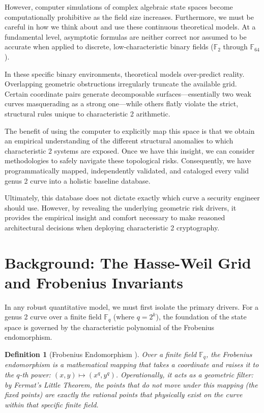\documentclass[11pt,letterpaper]{article}
\newtheorem{definition}[theorem]{Definition}
\begin{document}
However, computer simulations of complex algebraic state spaces become computationally prohibitive as the field size increases. Furthermore, we must be careful in how we think about and use these continuous theoretical models. At a fundamental level, asymptotic formulas are neither correct nor assumed to be accurate when applied to discrete, low-characteristic binary fields ($\mathbb{F}_2$ through $\mathbb{F}_{64}$). 

In these specific binary environments, theoretical models over-predict reality. Overlapping geometric obstructions irregularly truncate the available grid. Certain coordinate pairs generate decomposable surfaces---essentially two weak curves masquerading as a strong one---while others flatly violate the strict, structural rules unique to characteristic 2 arithmetic. 

The benefit of using the computer to explicitly map this space is that we obtain an empirical understanding of the different structural anomalies to which characteristic 2 systems are exposed. Once we have this insight, we can consider methodologies to safely navigate these topological risks. Consequently, we have programmatically mapped, independently validated, and cataloged every valid genus 2 curve into a holistic baseline database. 

Ultimately, this database does not dictate exactly which curve a security engineer should use. However, by revealing the underlying geometric risk drivers, it provides the empirical insight and comfort necessary to make reasoned architectural decisions when deploying characteristic 2 cryptography.

\section{Background: The Hasse-Weil Grid and Frobenius Invariants}
In any robust quantitative model, we must first isolate the primary drivers. For a genus 2 curve over a finite field $\mathbb{F}_q$ (where $q = 2^k$), the foundation of the state space is governed by the characteristic polynomial of the Frobenius endomorphism. 

\begin{definition}[Frobenius Endomorphism \cite{Silverman2009}]
Over a finite field $\mathbb{F}_q$, the Frobenius endomorphism is a mathematical mapping that takes a coordinate and raises it to the $q$-th power: $(x, y) \mapsto (x^q, y^q)$. Operationally, it acts as a geometric filter: by Fermat's Little Theorem, the points that do not move under this mapping (the fixed points) are exactly the rational points that physically exist on the curve within that specific finite field.
\end{definition}
\end{document}
